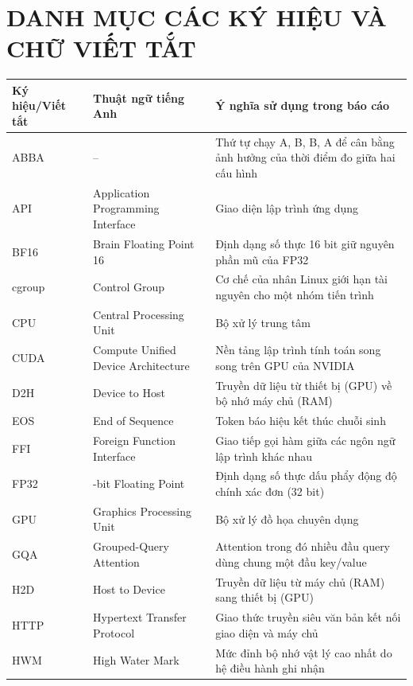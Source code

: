 \chapter*{DANH MỤC CÁC KÝ HIỆU VÀ CHỮ VIẾT TẮT}

\begin{longtable}{@{}>{\RaggedRight\arraybackslash}p{2.2cm} >{\RaggedRight\arraybackslash}p{4.4cm} >{\RaggedRight\arraybackslash}p{8.5cm}@{}}
\toprule
\rowcolor{tableheader}
\textbf{Ký hiệu/Viết tắt} & \textbf{Thuật ngữ tiếng Anh} & \textbf{Ý nghĩa sử dụng trong báo cáo} \\
\midrule
\endhead
\bottomrule
\endfoot

ABBA & -- & Thứ tự chạy A, B, B, A để cân bằng ảnh hưởng của thời điểm đo giữa hai cấu hình \\
API & Application Programming Interface & Giao diện lập trình ứng dụng \\
BF16 & Brain Floating Point 16 & Định dạng số thực 16 bit giữ nguyên phần mũ của FP32 \\
cgroup & Control Group & Cơ chế của nhân Linux giới hạn tài nguyên cho một nhóm tiến trình \\
CPU & Central Processing Unit & Bộ xử lý trung tâm \\
CUDA & Compute Unified Device Architecture & Nền tảng lập trình tính toán song song trên GPU của NVIDIA \\
D2H & Device to Host & Truyền dữ liệu từ thiết bị (GPU) về bộ nhớ máy chủ (RAM) \\
EOS & End of Sequence & Token báo hiệu kết thúc chuỗi sinh \\
FFI & Foreign Function Interface & Giao tiếp gọi hàm giữa các ngôn ngữ lập trình khác nhau \\
FP32 & 32-bit Floating Point & Định dạng số thực dấu phẩy động độ chính xác đơn (32 bit) \\
GPU & Graphics Processing Unit & Bộ xử lý đồ họa chuyên dụng \\
GQA & Grouped-Query Attention & Attention trong đó nhiều đầu query dùng chung một đầu key/value \\
H2D & Host to Device & Truyền dữ liệu từ máy chủ (RAM) sang thiết bị (GPU) \\
HTTP & Hypertext Transfer Protocol & Giao thức truyền siêu văn bản kết nối giao diện và máy chủ \\
HWM & High Water Mark & Mức đỉnh bộ nhớ vật lý cao nhất do hệ điều hành ghi nhận \\

\end{longtable}
